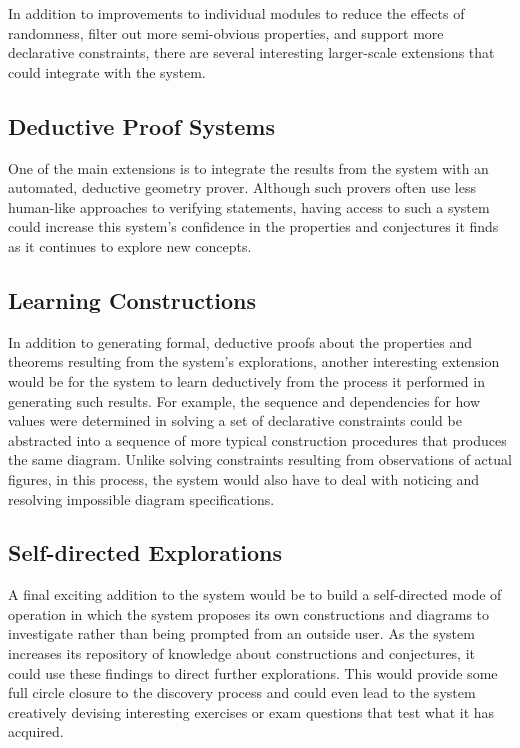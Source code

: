 In addition to improvements to individual modules to reduce the
effects of randomness, filter out more semi-obvious properties,
and support more declarative constraints, there are several
interesting larger-scale extensions that could integrate with the
system.

\subsection{Deductive Proof Systems}

One of the main extensions is to integrate the results from the system
with an automated, deductive geometry prover. Although such provers
often use less human-like approaches to verifying statements, having
access to such a system could increase this system's confidence in the
properties and conjectures it finds as it continues to explore new concepts.

\subsection{Learning Constructions}

In addition to generating formal, deductive proofs about the
properties and theorems resulting from the system's explorations,
another interesting extension would be for the system to learn
deductively from the process it performed in generating such
results. For example, the sequence and dependencies for how values
were determined in solving a set of declarative constraints could be
abstracted into a sequence of more typical construction procedures
that produces the same diagram. Unlike solving constraints resulting
from observations of actual figures, in this process, the system would
also have to deal with noticing and resolving impossible diagram
specifications.

\subsection{Self-directed Explorations}

A final exciting addition to the system would be to build a
self-directed mode of operation in which the system proposes its own
constructions and diagrams to investigate rather than being prompted
from an outside user.  As the system increases its repository of
knowledge about constructions and conjectures, it could use these
findings to direct further explorations.  This would provide some full
circle closure to the discovery process and could even lead to the
system creatively devising interesting exercises or exam questions
that test what it has acquired.
